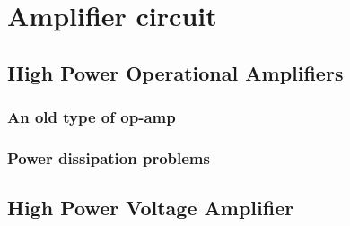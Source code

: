 \section{Amplifier circuit}

\subsection{High Power Operational Amplifiers}

\subsubsection{An old type of op-amp}
\subsubsection{Power dissipation problems}

\subsection{High Power Voltage Amplifier}
